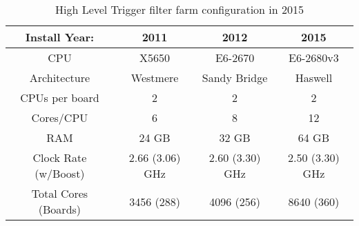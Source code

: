 \begin{center}
\begin{table}[]
\begin{center}
\caption{High Level Trigger filter farm configuration in 2015 \cite{timing}}
\begin{tabular}{cccc}
Install Year: & 2011 & 2012 & 2015 \\  
\hline
CPU & X5650  & E6-2670  & E6-2680v3  \\
Architecture & Westmere  & Sandy Bridge & Haswell \\
CPUs per board & 2 & 2 & 2 \\
Cores/CPU & 6 & 8 & 12 \\
RAM & 24 GB & 32 GB & 64 GB \\
Clock Rate (w/Boost) & 2.66 (3.06) GHz & 2.60 (3.30) GHz & 2.50 (3.30) GHz \\

Total Cores (Boards) & 3456 (288) & 4096 (256) & 8640 (360) \\ 
\end{tabular}
\end{center}
\end{table}
\end{center}
